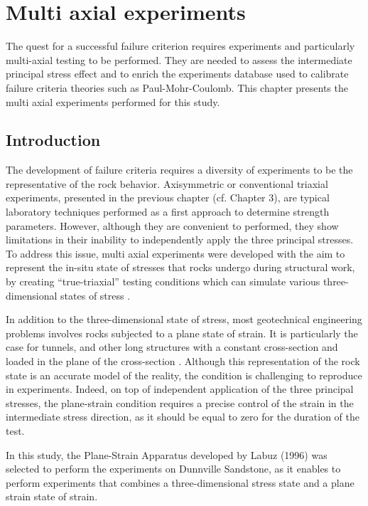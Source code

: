 \chapter{Multi axial experiments}

The quest for a successful failure criterion requires experiments and particularly multi-axial testing \cite{Labuz2018} to be performed. They are needed to assess the intermediate principal stress effect and to enrich the experiments database used to calibrate failure criteria theories such as Paul-Mohr-Coulomb. This chapter presents the multi axial experiments performed for this study. 


\section{Introduction}

The development of failure criteria requires a diversity of experiments to be the representative of the rock behavior. Axisymmetric or conventional triaxial experiments, presented in the previous chapter (cf. Chapter 3), are typical laboratory techniques performed as a first approach to determine strength parameters. However, although they are convenient to performed, they show limitations in their inability to independently apply the three principal stresses. To address this issue, multi axial experiments were developed with the aim to represent the in-situ state of stresses that rocks undergo during structural work, by creating “true-triaxial” testing conditions which can simulate various three-dimensional states of stress \cite{Labuz2018} .

In addition to the three-dimensional state of stress, most geotechnical engineering problems involves rocks subjected to a plane state of strain. It is particularly the case for tunnels, and other long structures with a constant cross-section and loaded in the plane of the cross-section \cite{Jaeger1979}. Although this representation of the rock state is an accurate model of the reality, the condition is challenging to reproduce in experiments. Indeed, on top of independent application of the three principal stresses, the plane-strain condition requires a precise control of the strain in the intermediate stress direction, as it should be equal to zero for the duration of the test. 

In this study, the Plane-Strain Apparatus developed by Labuz (1996) \cite{Labuz1996}  was selected to perform the experiments on Dunnville Sandstone, as it enables to perform experiments that combines a three-dimensional stress state and a plane strain state of strain. 

